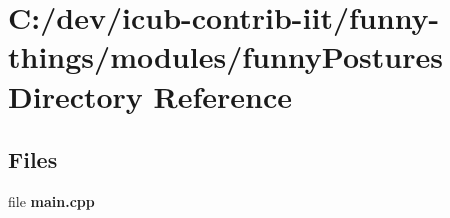 \section{C\+:/dev/icub-\/contrib-\/iit/funny-\/things/modules/funny\+Postures Directory Reference}
\label{dir_e2199ffcfb439558047501eb9fbf08f7}
\subsection*{Files}
\begin{DoxyCompactItemize}
\item 
file {\bfseries main.\+cpp}
\end{DoxyCompactItemize}
